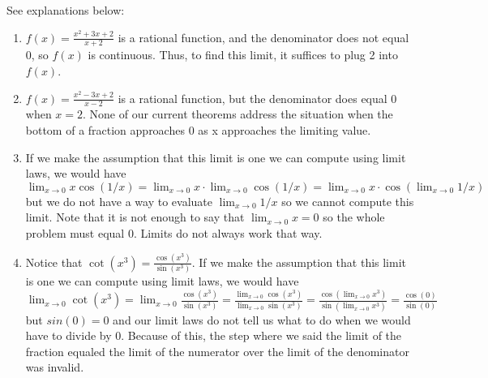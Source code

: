 \documentclass{ximera}
\begin{document}
\begin{question}
    \begin{feedback} See explanations below:
    \begin{enumerate}
    \item $f(x)=\frac{x^2+3x+2}{x+2}$ is a rational function, and the denominator does not equal 0, so $f(x)$ is continuous.  Thus, to find this limit, it suffices to plug 2 into $f(x)$.
    \item $f(x)=\frac{x^2-3x+2}{x-2}$ is a rational function, but the denominator does equal 0 when $x=2$.  None of our current theorems address the situation when the bottom of a fraction approaches 0 as x approaches the limiting value. 
    \item If we make the assumption that this limit is one we can compute using limit laws, we would have 
    $\lim_{x\to 0} x\cos(1/x) = \lim_{x\to 0} x \cdot \lim_{x\to 0} \cos(1/x) = \lim_{x\to 0} x \cdot  \cos(\lim_{x\to 0}1/x)$ 
     but we do not have a way to evaluate $\lim_{x\to 0}1/x$ so we cannot compute this limit.  Note that it is not enough to say    that $\lim_{x\to 0} x =0$ so the whole problem must equal 0.  Limits do not always work that way.
    \item Notice that $\cot(x^3) = \frac{\cos(x^3)}{\sin(x^3)}$.  If we make the assumption that this limit is one we can compute using limit laws, we would have 
    $\lim_{x\to 0} \cot(x^3) = 
    \lim_{x\to 0} \frac{\cos(x^3)}{\sin(x^3)} = 
    \frac{\lim_{x\to 0} \cos(x^3)}{\lim_{x\to 0} \sin(x^3)} = 
    \frac{ \cos(\lim_{x\to 0}x^3)}{ \sin(\lim_{x\to 0}x^3)}= 
    \frac{ \cos(0)}{ \sin(0)}$ but $sin(0)=0$ and our limit laws do not tell us what to do when we would have to divide by 0.  Because of this, the step where we said the limit of the fraction equaled the limit of the numerator over the limit of the denominator was invalid. 
    \end{enumerate}
    \end{feedback} 
    
\end{question}
\end{document}
